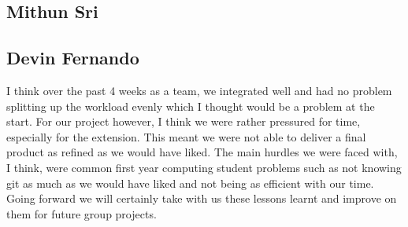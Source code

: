 \documentclass[11pt]{article}
\begin{document}
\subsection*{Mithun Sri}

\subsection*{Devin Fernando}
I think over the past 4 weeks as a team, we integrated well and had no problem splitting up the workload evenly which I thought would be a problem at the start. For our project however, I think we were rather pressured for time, especially for the extension. This meant we were not able to deliver a final product as refined as we would have liked. The main hurdles we were faced with, I think, were common first year computing student problems such as not knowing git as much as we would have liked and not being as efficient with our time. Going forward we will certainly take with us these lessons learnt and improve on them for future group projects.
\end{document}
